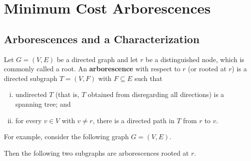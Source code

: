 \section{Minimum Cost Arborescences}\label{sec:3}

\subsection{Arborescences and a Characterization}\label{subsec:3.1}
Let $G = (V, E)$ be a directed graph and let $r$ be a distinguished 
node, which is commonly called a root. An {\bf arborescence} with respect to 
$r$ (or rooted at $r$) is a directed subgraph $T = (V, F)$ with $F \subseteq E$ 
such that 
\begin{enumerate}[(i)]
    \item undirected $T$ (that is, $T$ obtained from disregarding all directions) is a spanning tree; and 
    \item for every $v \in V$ with $v \neq r$, there is a directed path 
    in $T$ from $r$ to $v$. 
\end{enumerate}
For example, consider the following graph $G = (V, E)$. 
\begin{center}
\end{center}
\vspace{-0.25cm}
Then the following two subgraphs are arborescences rooted at $r$.
